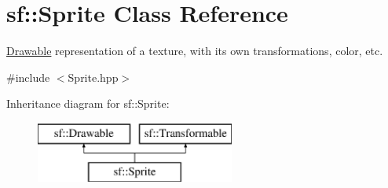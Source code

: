 \hypertarget{classsf_1_1_sprite}{}\section{sf\+:\+:Sprite Class Reference}
\label{classsf_1_1_sprite}


\hyperlink{classsf_1_1_drawable}{Drawable} representation of a texture, with its own transformations, color, etc.  




{\ttfamily \#include $<$Sprite.\+hpp$>$}

Inheritance diagram for sf\+:\+:Sprite\+:\begin{figure}[H]
\begin{center}
\leavevmode
\includegraphics[height=2.000000cm]{classsf_1_1_sprite}
\end{center}
\end{figure}
